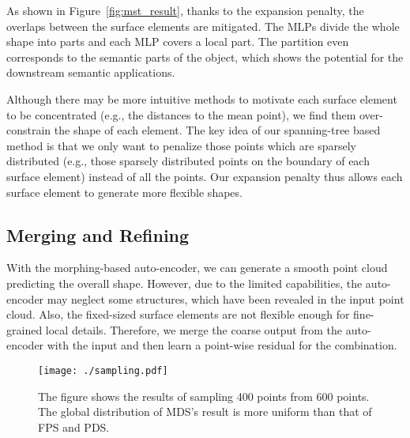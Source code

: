 \documentclass[letterpaper]{article} \usepackage{aaai20}  \usepackage{times}  \usepackage{helvet} \usepackage{courier}  \usepackage[hyphens]{url}  \usepackage{graphicx} \urlstyle{rm} \def\UrlFont{\rm}  \usepackage{graphicx}  \frenchspacing  \setlength{\pdfpagewidth}{8.5in}  \setlength{\pdfpageheight}{11in}  \usepackage{amsmath}
\begin{document}
As shown in Figure~\ref{fig:mst_result}, thanks to the expansion penalty, the overlaps between the surface elements are mitigated. The MLPs divide the whole shape into  parts and each MLP covers a local part. The partition even corresponds to the semantic parts of the object, which shows the potential for the downstream semantic applications. 

Although there may be more intuitive methods to motivate each surface element to be concentrated (e.g., the distances to the mean point), we find them over-constrain the shape of each element. The key idea of our spanning-tree based method is that we only want to penalize those points which are sparsely distributed (e.g., those sparsely distributed points on the boundary of each surface element) instead of all the points. Our expansion penalty thus allows each surface element to generate more flexible shapes. 



\subsection{Merging and Refining} 
With the morphing-based auto-encoder, we can generate a smooth point cloud predicting the overall shape. However, due to the limited capabilities, the auto-encoder may neglect some structures, which have been revealed in the input point cloud. Also, the fixed-sized surface elements are not flexible enough for fine-grained local details. Therefore, we merge the coarse output from the auto-encoder with the input and then learn a point-wise residual for the combination.  

\begin{figure}[t]
  \centering
  \texttt{[image: ./sampling.pdf]}
  \caption{The figure shows the results of sampling 400 points from 600 points. The global distribution of MDS's result is more uniform than that of FPS and PDS.}
  \label{sampling}
\end{figure}
\end{document}
